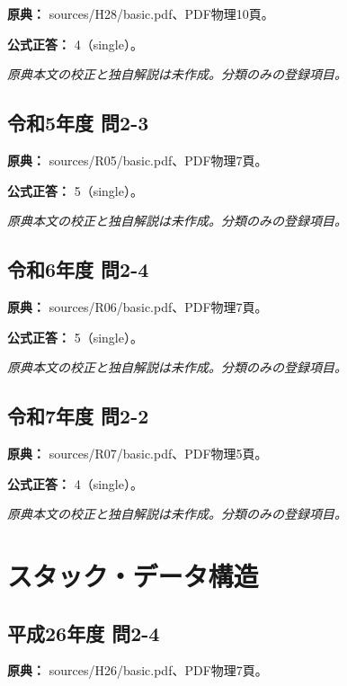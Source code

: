 \noindent\textbf{原典：} sources/H28/basic.pdf、PDF物理10頁。

\textbf{公式正答：} 4（single）。

\par\textit{原典本文の校正と独自解説は未作成。分類のみの登録項目。}

\subsection{令和5年度 問2-3}
\label{q:r05-reg-basic-2-3}

\noindent\textbf{原典：} sources/R05/basic.pdf、PDF物理7頁。

\textbf{公式正答：} 5（single）。

\par\textit{原典本文の校正と独自解説は未作成。分類のみの登録項目。}

\subsection{令和6年度 問2-4}
\label{q:r06-reg-basic-2-4}

\noindent\textbf{原典：} sources/R06/basic.pdf、PDF物理7頁。

\textbf{公式正答：} 5（single）。

\par\textit{原典本文の校正と独自解説は未作成。分類のみの登録項目。}

\subsection{令和7年度 問2-2}
\label{q:r07-reg-basic-2-2}

\noindent\textbf{原典：} sources/R07/basic.pdf、PDF物理5頁。

\textbf{公式正答：} 4（single）。

\par\textit{原典本文の校正と独自解説は未作成。分類のみの登録項目。}

\section{スタック・データ構造}

\subsection{平成26年度 問2-4}
\label{q:h26-reg-basic-2-4}

\noindent\textbf{原典：} sources/H26/basic.pdf、PDF物理7頁。

